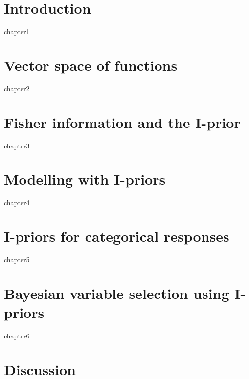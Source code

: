\documentclass[a4paper,showframe,11pt]{report}
\begin{document}
\hTOCandLists
\clearpage


\chapter{Introduction} 
{chapter1}

\chapter{Vector space of functions}
{chapter2}

\chapter{Fisher information and the I-prior}
{chapter3}

\chapter{Modelling with I-priors}
{chapter4}

\chapter{I-priors for categorical responses}
{chapter5}

\chapter{Bayesian variable selection using I-priors}
{chapter6}

\chapter{Discussion}


\hPrintBibliography
\end{document}
